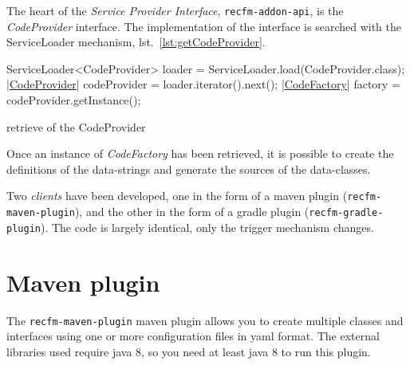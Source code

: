 \documentclass[a4paper,10pt]{report}
\newenvironment{elisting}[1][H]
  {\captionsetup{aboveskip=0pt}\begin{listing}[#1]}
  {\end{listing}%
}
\begin{document}
The heart of the \textsl{Service Provider Interface}, \verb!recfm-addon-api!, is 
the \textsl{CodeProvider} interface. The implementation of the interface is 
searched with the ServiceLoader mechanism, lst.~\ref{lst:getCodeProvider}.

\begin{elisting}[!htb]
\begin{javacode}
        ServiceLoader<CodeProvider> loader = ServiceLoader.load(CodeProvider.class);
        |\hyperref[lst:CodeProvider]{CodeProvider}| codeProvider = loader.iterator().next();
        |\hyperref[lst:CodeFactory]{CodeFactory}| factory = codeProvider.getInstance();
\end{javacode}
\caption{retrieve of the CodeProvider}
\label{lst:getCodeProvider}
\end{elisting}

Once an instance of \textsl{CodeFactory} has been retrieved, it is possible to 
create the definitions of the data-strings and generate the sources of the 
data-classes.

Two \textsl{clients} have been developed, one in the form of a maven plugin 
(\verb!recfm-maven-plugin!), and the other in the form of a gradle plugin 
(\verb!recfm-gradle-plugin!). 
The code is largely identical, only the trigger mechanism changes.

\chapter{Maven plugin}\label{sec:maven}
The \verb!recfm-maven-plugin! maven plugin allows you to create multiple classes 
and interfaces using one or more configuration files in yaml format. 
The external libraries used require java 8, so you need at least java 8 to run 
this plugin.
\end{document}
